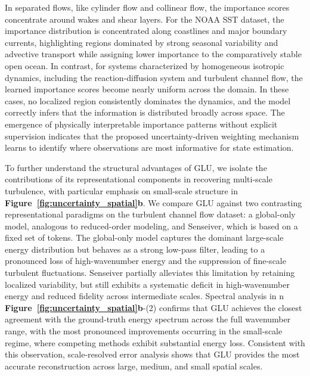 \documentclass[pdflatex,sn-nature]{sn-jnl}%
\begin{document}
In separated flows, like cylinder flow and collinear flow, the importance scores concentrate around wakes and shear layers.
For the NOAA SST dataset, the importance distribution is concentrated along coastlines and major boundary currents, highlighting regions dominated by strong seasonal variability and advective transport while assigning lower importance to the comparatively stable open ocean. 
In contrast, for systems characterized by homogeneous isotropic dynamics, including the reaction-diffusion system and turbulent channel flow, the learned importance scores become nearly uniform across the domain. 
In these cases, no localized region consistently dominates the dynamics, and the model correctly infers that the information is distributed broadly across space. 
The emergence of physically interpretable importance patterns without explicit supervision indicates that the proposed uncertainty-driven weighting mechanism learns to identify where observations are most informative for state estimation.

To further understand the structural advantages of GLU, we isolate the contributions of its representational components in recovering multi-scale turbulence, with particular emphasis on small-scale structure in \textbf{Figure~\ref{fig:uncertainty_spatial}b}. 
We compare GLU against two contrasting representational paradigms on the turbulent channel flow dataset: a global-only model, analogous to reduced-order modeling, and Senseiver, which is based on a fixed set of tokens. 
The global-only model captures the dominant large-scale energy distribution but behaves as a strong low-pass filter, leading to a pronounced loss of high-wavenumber energy and the suppression of fine-scale turbulent fluctuations. 
Senseiver partially alleviates this limitation by retaining localized variability, but still exhibits a systematic deficit in high-wavenumber energy and reduced fidelity across intermediate scales. 
Spectral analysis in n \textbf{Figure~\ref{fig:uncertainty_spatial}b}-(2) confirms that GLU achieves the closest agreement with the ground-truth energy spectrum across the full wavenumber range, with the most pronounced improvements occurring in the small-scale regime, where competing methods exhibit substantial energy loss. 
Consistent with this observation, scale-resolved error analysis shows that GLU provides the most accurate reconstruction across large, medium, and small spatial scales.
\end{document}
